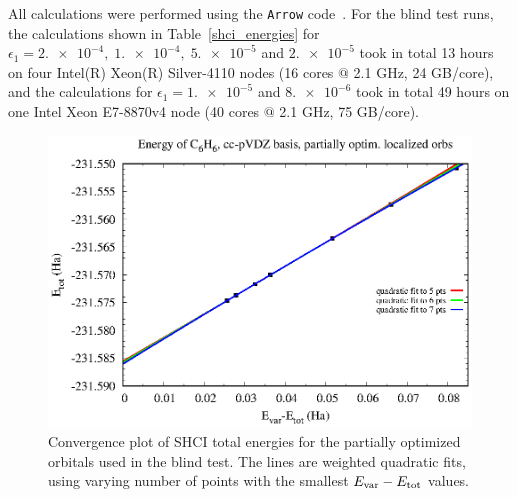 \documentclass[journal=jcp,manuscript=suppinfo]{achemso}
\begin{document}
All calculations were performed using the {\texttt{Arrow}} code~\cite{arrow}. For the blind test runs, the calculations shown in Table~\ref{shci_energies} for $\epsilon_1 = \num{2.e-4},\; \num{1.e-4},\; \num{5.e-5}$ and $\num{2.e-5}$ took in total 13 hours on four Intel(R) Xeon(R) Silver-4110 nodes (16 cores $@$ 2.1 GHz, 24 GB/core), and the calculations for $\epsilon_1 = \num{1.e-5}$ and $\num{8.e-6}$ took in total 49 hours on one Intel Xeon E7-8870v4 node (40 cores $@$ 2.1 GHz, 75 GB/core).

\begin{figure}[ht!]
\begin{center}
\includegraphics[scale=1.0]{figures/shci/energy_conv_C6H6_3a.eps}
\caption{Convergence plot of SHCI total energies for the partially optimized orbitals used in the blind test.
The lines are weighted quadratic fits, using varying number of points with the smallest $E_{\rm var}-E_{\rm tot}$ values.}
\label{fig:shci_energy_blind}
\end{center}
\end{figure}
\end{document}

